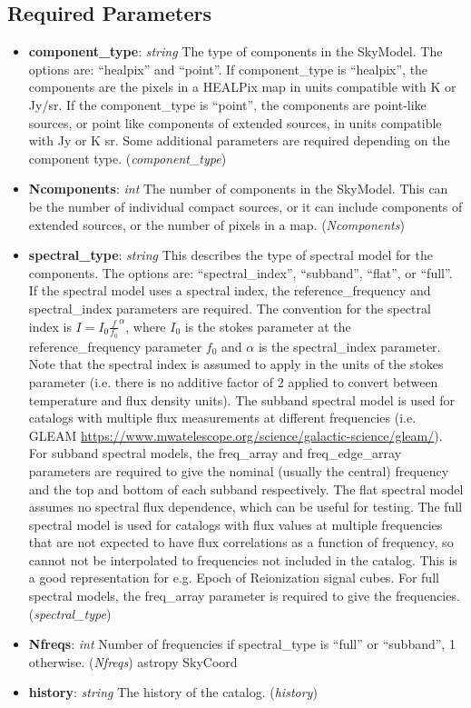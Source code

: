 \documentclass[11pt, oneside]{article}
\begin{document}
\subsection{Required Parameters}
\label{sec:req_params}
\begin{itemize}

\item \textbf{component\_type}: \textit{string} The type of components in the SkyModel. The options are: ``healpix'' and ``point''.
If component\_type is ``healpix'', the components are the pixels in a HEALPix map in units compatible with K or Jy/sr.
If the component\_type is ``point'', the components are point-like sources, or point like components of extended sources,
in units compatible with Jy or K sr. Some additional parameters are required depending on the component type. (\textit{component\_type})

\item \textbf{Ncomponents}: \textit{int} The number of components in the SkyModel. This can be the number of individual
compact sources, or it can include components of extended sources, or the number of pixels in a map. (\textit{Ncomponents})

\item \textbf{spectral\_type}: \textit{string} This describes the type of spectral model for the components. The options are:
``spectral\_index'', ``subband'', ``flat'', or ``full''. If the spectral model uses a spectral index, the reference\_frequency and
spectral\_index parameters are required. The convention for the spectral index is $I=I_0 \frac{f}{f_0}^{\alpha}$, where
$I_0$ is the stokes parameter at the reference\_frequency parameter $f_0$ and $\alpha$ is the spectral\_index parameter.
Note that the spectral index is assumed to apply in the units of the stokes parameter (i.e. there is no additive factor of 2 applied
to convert between temperature and flux density units).
The subband spectral model is used for catalogs with multiple flux measurements at different frequencies (i.e. GLEAM
\url{https://www.mwatelescope.org/science/galactic-science/gleam/}). For subband  spectral models, the freq\_array
and freq\_edge\_array parameters are required to give the nominal (usually the central) frequency and the top and bottom of
each subband respectively.
The flat spectral model assumes no spectral flux dependence, which can be useful for testing.
The full spectral model is used for catalogs with flux values at multiple frequencies that are not expected to have flux correlations as a function of frequency, so cannot not be interpolated to frequencies not included in the catalog. This is a good representation for e.g. Epoch of Reionization signal cubes.
For full  spectral models, the freq\_array parameter is required to give the frequencies.
(\textit{spectral\_type})

\item \textbf{Nfreqs}: \textit{int}
Number of frequencies if spectral\_type is ``full'' or ``subband'', 1 otherwise. (\textit{Nfreqs})
astropy SkyCoord
\item \textbf{history}: \textit{string} The history of the catalog. (\textit{history})
\end{itemize}
\end{document}
